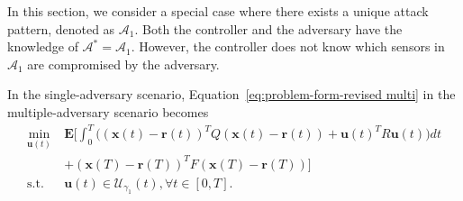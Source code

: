 \documentclass[journal]{IEEEtran}
\begin{document}

In this section, we consider a special case where there exists a unique attack pattern, denoted as $\mathcal{A}_1.$ Both the controller and the adversary have the knowledge of $\mathcal{A}^{\ast} = \mathcal{A}_1.$ However, the controller does not know which sensors in $\mathcal{A}_1$ are compromised by the adversary. 

In the single-adversary scenario, Equation~\eqref{eq:problem-form-revised multi} in the multiple-adversary scenario becomes
 \begin{align}
 \label{eq:problem-form-revised}
 \min_{\mathbf{u}(t)} \ & \mathbf{E}[\int_{0}^{T}{((\mathbf{x}(t)-\mathbf{r}(t))^{T}Q(\mathbf{x}(t)-\mathbf{r}(t)) }   + \mathbf{u}(t)^{T}R\mathbf{u}(t))  dt \nonumber \\
 &+(\mathbf{x}(T)-\mathbf{r}(T))^{T}F(\mathbf{x}(T)-\mathbf{r}(T)) ] \\
 \mbox{s.t.} \ & \mathbf{u}(t) \in \mathcal{U}_{\gamma_1}(t), \forall t \in [0,T]. \label{eq:problem-form-revised con} 
 \end{align}
\end{document}
